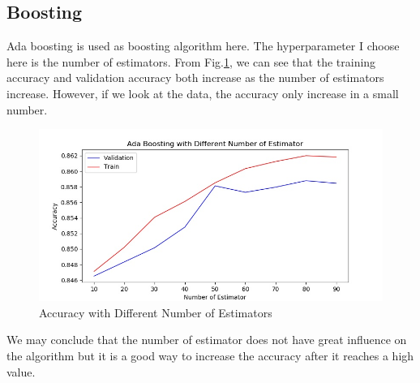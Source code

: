 \documentclass[11pt]{article}
\begin{document}
\subsection{Boosting}
Ada boosting is used as boosting algorithm here. The hyperparameter I choose here is the number of estimators. From Fig.\ref{fig:adult_ada}, we can see that the training accuracy and validation accuracy both increase as the number of estimators increase. However, if we look at the data, the accuracy only increase in a small number. 
\begin{figure}[h!]
  \includegraphics[width=\linewidth]{./adult/ada_num_estimator.jpg}
  \caption{Accuracy with Different Number of Estimators}
  \label{fig:adult_ada}
\end{figure}
We may conclude that the number of estimator does not have great influence on the algorithm but it is a good way to increase the accuracy after it reaches a high value.
\end{document}
